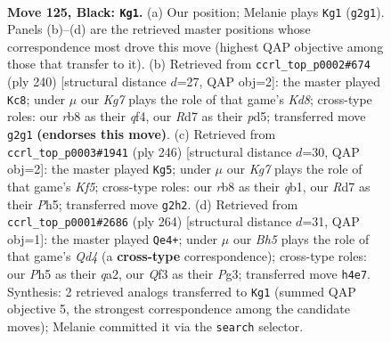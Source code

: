 \documentclass[11pt]{article}
\begin{document}
\clearpage

\begin{figure}[p]\centering
\begin{subfigure}{0.46\textwidth}\centering
\resizebox{\linewidth}{!}{%
\newchessgame
\chessboard[
  setfen={1R6/3r3n/8/4p2p/7b/5q2/K5k1/8 b - - 3 125},
  showmover=false,
  pgfstyle=straightmove, color=movearrow, markmove={g2-g1}
]}
\caption{}
\end{subfigure}\hfill
\begin{subfigure}{0.46\textwidth}\centering
\resizebox{\linewidth}{!}{%
\newchessgame
\chessboard[
  setfen={3K2k1/4Q3/4P3/3p4/5q2/8/8/8 w - - 7 121},
  showmover=false,
  pgfstyle=straightmove, color=movearrow, markmove={d8-c8}
]}
\caption{}
\end{subfigure}
\\[4pt]
\begin{subfigure}{0.46\textwidth}\centering
\resizebox{\linewidth}{!}{%
\newchessgame
\chessboard[
  setfen={7k/8/5P2/4QK1P/8/8/8/1q6 w - - 35 124},
  showmover=false,
  pgfstyle=straightmove, color=movearrow, markmove={f5-g5}
]}
\caption{}
\end{subfigure}\hfill
\begin{subfigure}{0.46\textwidth}\centering
\resizebox{\linewidth}{!}{%
\newchessgame
\chessboard[
  setfen={8/7k/8/6P1/3Q2K1/6P1/q7/8 w - - 65 133},
  showmover=false,
  pgfstyle=straightmove, color=movearrow, markmove={d4-e4}
]}
\caption{}
\end{subfigure}
\caption{\textbf{Move 125, Black: \texttt{Kg1}.} (a) Our position; Melanie plays \texttt{Kg1} (\texttt{g2g1}). Panels (b)--(d) are the retrieved master positions whose correspondence most drove this move (highest QAP objective among those that transfer to it). (b) Retrieved from \texttt{ccrl\_top\_p0002\#674} (ply 240) [structural distance $d$=27, QAP obj=2]: the master played \texttt{Kc8}; under $\mu$ our \emph{Kg7} plays the role of that game's \emph{Kd8}; cross-type roles: our \emph{r}b8 as their \emph{q}f4, our \emph{R}d7 as their \emph{p}d5; transferred move \texttt{g2g1} \textbf{(endorses this move)}. (c) Retrieved from \texttt{ccrl\_top\_p0003\#1941} (ply 246) [structural distance $d$=30, QAP obj=2]: the master played \texttt{Kg5}; under $\mu$ our \emph{Kg7} plays the role of that game's \emph{Kf5}; cross-type roles: our \emph{r}b8 as their \emph{q}b1, our \emph{R}d7 as their \emph{P}h5; transferred move \texttt{g2h2}. (d) Retrieved from \texttt{ccrl\_top\_p0001\#2686} (ply 264) [structural distance $d$=31, QAP obj=1]: the master played \texttt{Qe4+}; under $\mu$ our \emph{Bh5} plays the role of that game's \emph{Qd4} (a \textbf{cross-type} correspondence); cross-type roles: our \emph{P}h5 as their \emph{q}a2, our \emph{Q}f3 as their \emph{P}g3; transferred move \texttt{h4e7}. Synthesis: 2 retrieved analogs transferred to \texttt{Kg1} (summed QAP objective 5, the strongest correspondence among the candidate moves); Melanie committed it via the \texttt{search} selector.}
\label{fig:thought-m249}
\end{figure}
\end{document}

